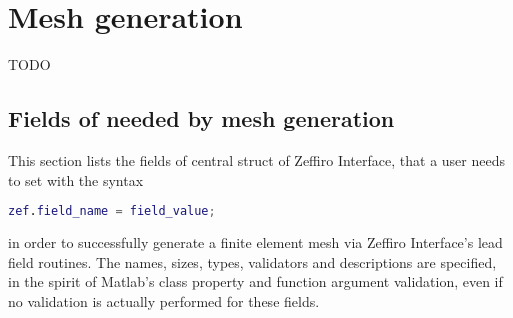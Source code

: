 \section{Mesh generation}\label{sec:mesh-generation}

TODO


\subsection{Fields of  needed by mesh generation}%
\label{ssec:meshing-fields}

This section lists the fields of central struct  of Zeffiro
Interface, that a user needs to set with the syntax
\begin{lstlisting}[style=unnumberedlines, language=Matlab]
zef.field_name = field_value;
\end{lstlisting}
in order to successfully generate a finite element mesh via Zeffiro
Interface's lead field routines. The names, sizes, types, validators and
descriptions are specified, in the spirit of Matlab's class property and
function argument validation, even if no validation is actually performed for
these fields.














